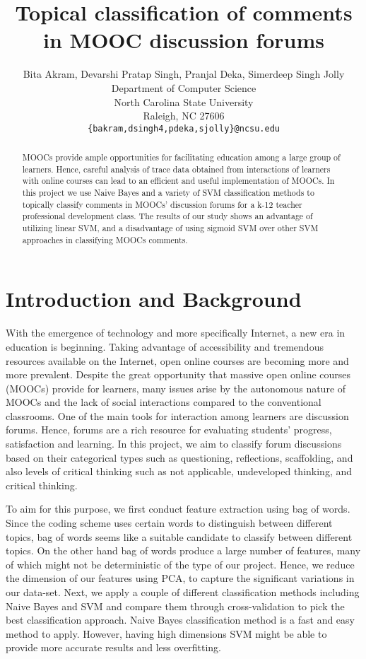 \documentclass{article}
\title{Topical classification of comments in MOOC discussion forums}
\author{
  Bita Akram, Devarshi Pratap Singh, Pranjal Deka, Simerdeep Singh Jolly \\
  Department of Computer Science\\
  North Carolina State University\\
  Raleigh, NC 27606 \\
  \texttt{\{bakram,dsingh4,pdeka,sjolly\}@ncsu.edu} \\
}
\begin{document}

\maketitle

\begin{abstract}
MOOCs provide ample opportunities for facilitating education among a large group of learners. Hence, careful analysis of trace data obtained from interactions of learners with online courses can lead to an efficient and useful implementation of MOOCs. In this project we use Naive Bayes and a variety of SVM classification methods to topically classify comments in MOOCs' discussion forums for a k-12 teacher professional development class. The results of our study shows an advantage of utilizing linear SVM, and a disadvantage of using sigmoid SVM over other SVM approaches in classifying MOOCs comments.
\end{abstract}

\section{Introduction and Background}

With the emergence of technology and more specifically Internet, a new era in education is beginning. Taking advantage of accessibility and tremendous resources available on the Internet, open online courses are becoming more and more prevalent. Despite the great opportunity that massive open online courses (MOOCs) provide for learners, many issues arise by the autonomous nature of MOOCs and the lack of social interactions compared to the conventional classrooms. One of the main tools for interaction among learners are discussion forums. Hence, forums are a rich resource for evaluating students’ progress, satisfaction and learning. In this project, we aim to classify forum discussions based on their categorical types such as questioning, reflections, scaffolding, and also levels of critical thinking such as not applicable, undeveloped thinking, and critical thinking.

To aim for this purpose, we first conduct feature extraction using bag of words. Since the coding scheme uses certain words to distinguish between different topics, bag of words seems like a suitable candidate to classify between different topics. On the other hand bag of words produce a large number of features, many of which might not be deterministic of the type of our project. Hence, we reduce the dimension of our features using PCA, to capture the significant variations in our data-set. Next, we apply a couple of different classification methods including Naive Bayes and SVM and compare them through cross-validation to pick the best classification approach. Naive Bayes classification method is a fast and easy method to apply. However, having high dimensions SVM might be able to provide more accurate results and less overfitting.
\end{document}
